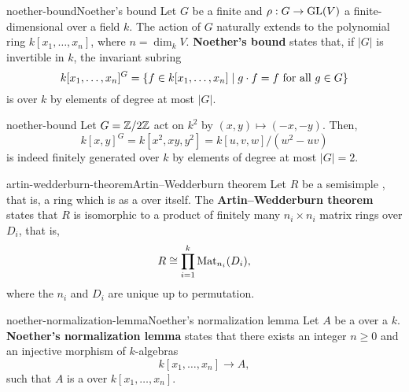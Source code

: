\begin{topic}{noether-bound}{Noether's bound}
    Let $G$ be a finite  and $\rho : G \to \textup{GL}(V)$ a finite-dimensional  over a field $k$. The action of $G$ naturally extends to the polynomial ring $k[x_1, \ldots, x_n]$, where $n = \dim_k V$. \textbf{Noether's bound} states that, if $|G|$ is invertible in $k$, the invariant subring
    \[ k[x_1, \ldots, x_n]^G = \{ f \in k[x_1, \ldots, x_n] \mid g \cdot f = f \textup{ for all } g \in G \} \]
    is  over $k$ by elements of degree at most $|G|$.
\end{topic}

\begin{example}{noether-bound}
    Let $G = \mathbb{Z}/2\mathbb{Z}$ act on $k^2$ by $(x, y) \mapsto (-x, -y)$. Then,
    \[ k[x, y]^G = k[x^2, xy, y^2] = k[u, v, w] / (w^2 - uv) \]
    is indeed finitely generated over $k$ by elements of degree at most $|G| = 2$.
\end{example}

\begin{topic}{artin-wedderburn-theorem}{Artin--Wedderburn theorem}
    Let $R$ be a semisimple , that is, a ring which is  as a  over itself. The \textbf{Artin--Wedderburn theorem} states that $R$ is isomorphic to a product of finitely many $n_i \times n_i$ matrix rings over  $D_i$, that is,
    \[ R \cong \prod_{i = 1}^{k} \textup{Mat}_{n_i}(D_i) , \]
    where the $n_i$ and $D_i$ are unique up to permutation.
\end{topic}

\begin{topic}{noether-normalization-lemma}{Noether's normalization lemma}
    Let $A$ be a  over a  $k$. \textbf{Noether's normalization lemma} states that there exists an integer $n \ge 0$ and an injective morphism of $k$-algebras
    \[ k[x_1, \ldots, x_n] \to A , \]
    such that $A$ is a  over $k[x_1, \ldots, x_n]$.
\end{topic}

